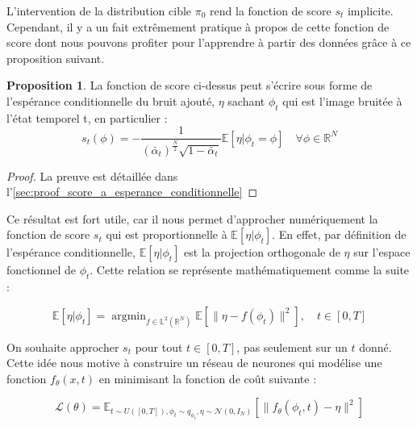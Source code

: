 \documentclass[a4paper,10pt]{article}
\theoremstyle{definition} %
\theoremstyle{definition} %
\newtheorem{proposition}[definition]{Proposition}
\theoremstyle{definition} %
\theoremstyle{definition} %
\newcommand{\E}[1]{\mathbb{E}\left[#1\right]}
\newcommand{\R}{\mathbb{R}}
\newcommand{\argmin}{\mathop{\mathrm{argmin}}}
\begin{document}
L'intervention de la distribution cible $\pi_0$ rend la fonction de score $s_t$ implicite. Cependant, il y a un fait extrêmement pratique à propos de cette fonction de score dont nous pouvons profiter pour l'apprendre à partir des données grâce à ce proposition suivant.


\begin{proposition}\label{prop:score_a_esperance_conditionnelle}
La fonction de score ci-dessus peut s'écrire sous forme de l'espérance conditionnelle du bruit ajouté, $\eta$ sachant $\phi_t$ qui est l'image bruitée à l'état temporel t, en particulier :
\begin{equation}\label{eq:score_a_esperance_conditionnelle}
s_t(\phi) = -\frac{1}{(\bar \alpha_t)^{\frac{N}{2}} \sqrt{1-\bar \alpha_t}}\E{\eta|\phi_t = \phi} \quad \forall\phi\in\R^N    
\end{equation}
\end{proposition}

\begin{proof}
    La preuve est détaillée dans l'\cref{sec:proof_score_a_esperance_conditionnelle}
\end{proof}



Ce résultat est fort utile, car il nous permet d'approcher numériquement la fonction de score $s_t$ qui est proportionnelle à $\mathbb{E}[\eta | \phi_t]$. En effet, par définition de l'espérance conditionnelle, $\mathbb{E}[\eta | \phi_t]$ est la projection orthogonale de $\eta$ sur l'espace fonctionnel de $\phi_t$. Cette relation se représente mathématiquement comme la suite :

\[
\mathbb{E}[\eta | \phi_t] = \argmin_{f \in \mathbb{L}^2(\mathbb{R}^N)} \mathbb{E}\left[ \| \eta - f(\phi_t) \|^2 \right], \quad t \in [0,T]
\]



On souhaite approcher $s_t$ pour tout $t \in [0,T]$, pas seulement sur un $t$ donné. Cette idée nous motive à construire un réseau de neurones qui modélise une fonction $f_\theta(x,t)$ en minimisant la fonction de coût suivante :

\[
\mathcal{L}(\theta) = \mathbb{E}_{t \sim U([0,T]), \phi_t \sim q_{\phi_t}, \eta \sim \mathcal{N}(0,I_N)} \left[ \| f_\theta(\phi_t,t) - \eta \|^2 \right]
\]
\end{document}
